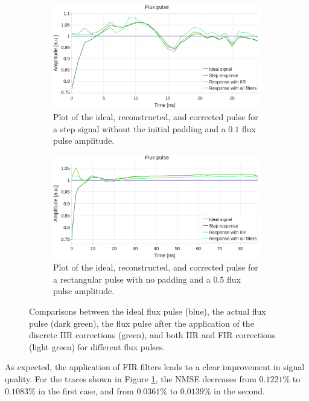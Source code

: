 \begin{figure}[h!]
    \centering
    \begin{subfigure}[t]{0.495\textwidth}
        \includegraphics[width=\textwidth]{figures/png/Cryoscope/step_nice.png}
        \caption{Plot of the ideal, reconstructed, and corrected pulse for a step signal without the initial padding and a $0.1$ flux pulse amplitude.}
        \label{fig:nice:nopad}
    \end{subfigure}
    \hfill
    \begin{subfigure}[t]{0.495\textwidth}
        \includegraphics[width=\textwidth]{figures/png/Cryoscope/long_nice.png}
        \caption{Plot of the ideal, reconstructed, and corrected pulse for a rectangular pulse with no padding and a $0.5$ flux pulse amplitude.}
        \label{fig:nice:long}
    \end{subfigure}
    \caption{Comparisons between the ideal flux pulse (blue), the actual flux pulse (dark green), the flux pulse after the application of the discrete IIR corrections (green), and both IIR and FIR corrections (light green) for different flux pulses.}
    \label{fig:nice}
\end{figure}

As expected, the application of FIR filters leads to a clear improvement in signal quality. 
For the traces shown in Figure \ref{fig:nice:nopad}, the NMSE decreases from $0.1221\%$ to $0.1083\%$ in the first case, and from $0.0361\%$ to $0.0139\%$ in the second.

